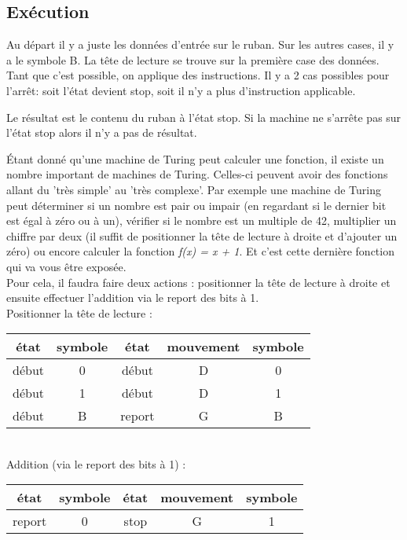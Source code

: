 \subsection{Exécution}
Au départ il y a juste les données d'entrée sur le ruban. Sur les autres cases, il y a
le symbole B. La tête de lecture se trouve sur la première case des données. Tant que
c'est possible, on applique des instructions. Il y a 2 cas possibles pour l'arrêt: soit
l'état devient stop, soit il n'y a plus d'instruction applicable.

 Le résultat est le contenu du ruban à l'état stop. Si la machine
ne s'arrête pas sur l'état stop alors il n'y a pas de résultat.

\begin{myexem}
Étant donné qu'une machine de Turing peut calculer une fonction, il existe un nombre important de machines de Turing. Celles-ci peuvent avoir des fonctions allant du 'très simple' au 'très complexe'. Par exemple une machine de Turing peut déterminer si un nombre est pair ou impair (en regardant si le dernier bit est égal à zéro ou à un), vérifier si le nombre est un multiple de 42, multiplier un chiffre par deux (il suffit de positionner la tête de lecture à droite et d'ajouter un zéro) ou encore calculer la fonction \textit{f(x) = x + 1}. Et c'est cette dernière fonction qui va vous être exposée.\\
Pour cela, il faudra faire deux actions : positionner la tête de lecture à droite et ensuite effectuer l'addition via le report des bits à 1.
\vspace{4pt} \\
Positionner la tête de lecture : \\
\begin{tabular}{|c|c|c|c|c|}
\hline
 état & symbole & état & mouvement & symbole \\\hline
 début & 0 & début & D & 0 \\ \hline
 début & 1 & début & D & 1 \\ \hline
 début & B & report & G & B \\ \hline
\end{tabular}
\vspace{4pt}
\\
Addition (via le report des bits à 1) : \\
\begin{tabular}{|c|c|c|c|c|}
\hline
 état & symbole & état & mouvement & symbole \\\hline
 report & 0 & stop & G & 1 \\ \hline

\end{tabular}
\end{myexem}
